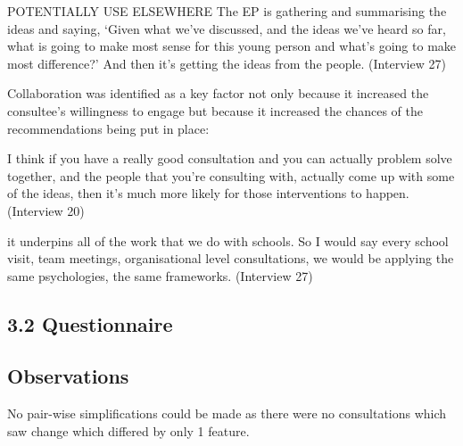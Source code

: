 \documentclass[
]{article}
\begin{document}
POTENTIALLY USE ELSEWHERE The EP is gathering and summarising the ideas
and saying, `Given what we've discussed, and the ideas we've heard so
far, what is going to make most sense for this young person and what's
going to make most difference?' And then it's getting the ideas from the
people. (Interview 27)

Collaboration was identified as a key factor not only because it
increased the consultee's willingness to engage but because it increased
the chances of the recommendations being put in place:

I think if you have a really good consultation and you can actually
problem solve together, and the people that you're consulting with,
actually come up with some of the ideas, then it's much more likely for
those interventions to happen. (Interview 20)

it underpins all of the work that we do with schools. So I would say
every school visit, team meetings, organisational level consultations,
we would be applying the same psychologies, the same frameworks.
(Interview 27)

\hypertarget{section}{%
\paragraph{}\label{section}}

\hypertarget{questionnaire}{%
\subsection{3.2 Questionnaire}\label{questionnaire}}

\hypertarget{observations-1}{%
\subsection{Observations}\label{observations-1}}

No pair-wise simplifications could be made as there were no
consultations which saw change which differed by only 1 feature.
\end{document}
